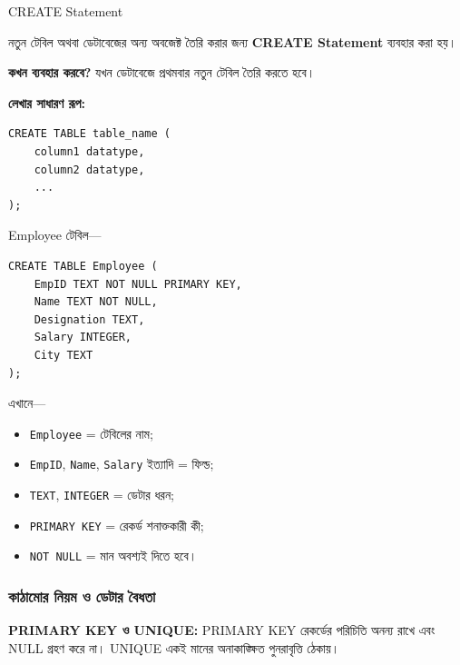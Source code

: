 \begin{definitionbox}{CREATE Statement}

নতুন টেবিল অথবা ডেটাবেজের অন্য অবজেক্ট তৈরি করার জন্য
\textbf{CREATE Statement} ব্যবহার করা হয়।

\end{definitionbox}

\textbf{কখন ব্যবহার করবে?} যখন ডেটাবেজে প্রথমবার নতুন টেবিল তৈরি করতে হবে।

\textbf{লেখার সাধারণ রূপ:}

\par\noindent\begin{minipage}{\linewidth}
\begin{verbatim}
CREATE TABLE table_name (
    column1 datatype,
    column2 datatype,
    ...
);
\end{verbatim}
\end{minipage}\par

Employee টেবিল—

\par\noindent\begin{minipage}{\linewidth}
\begin{verbatim}
CREATE TABLE Employee (
    EmpID TEXT NOT NULL PRIMARY KEY,
    Name TEXT NOT NULL,
    Designation TEXT,
    Salary INTEGER,
    City TEXT
);
\end{verbatim}
\end{minipage}\par

এখানে—

\begin{itemize}

\item \texttt{Employee} = টেবিলের নাম;

\item \texttt{EmpID}, \texttt{Name}, \texttt{Salary} ইত্যাদি = ফিল্ড;

\item \texttt{TEXT}, \texttt{INTEGER} = ডেটার ধরন;

\item \texttt{PRIMARY KEY} = রেকর্ড শনাক্তকারী কী;

\item \texttt{NOT NULL} = মান অবশ্যই দিতে হবে।

\end{itemize}

\subsubsection{কাঠামোর নিয়ম ও ডেটার বৈধতা}
\textbf{PRIMARY KEY ও UNIQUE:} PRIMARY KEY রেকর্ডের পরিচিতি অনন্য রাখে এবং NULL গ্রহণ করে না। UNIQUE একই মানের অনাকাঙ্ক্ষিত পুনরাবৃত্তি ঠেকায়।

